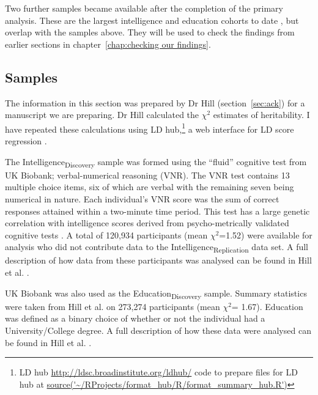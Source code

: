 Two further samples became available after the completion of the primary analysis. These are the largest intelligence and education cohorts to date \cite{savage2018genome}, \cite{lee2018gene} but overlap with the samples above. They will be used to check the findings from earlier sections in chapter~\ref{chap:checking our findings}.

\subsection{Samples}

\label{sec:samples from paper section}
The information in this section was prepared by Dr Hill (section~\ref{sec:ack}) for a manuscript we are preparing. Dr Hill calculated the $\chi^2$ estimates of heritability. I have repeated these calculations using LD hub,\footnote{LD hub \url{http://ldsc.broadinstitute.org/ldhub/} code to prepare files for LD hub at \url{source('~/RProjects/format_hub/R/format_summary_hub.R')}} a web interface for LD score regression \cite{zheng2017ld}.

 The Intelligence\textsubscript{Discovery} sample was formed using the ``fluid'' cognitive test from UK Biobank;  verbal-numerical reasoning (VNR). The VNR test contains 13 multiple choice items, six of which are verbal with the remaining seven being numerical in nature. Each individual’s VNR score was the sum of correct responses attained within a two-minute time period. This test has a large genetic correlation with intelligence scores derived from psycho-metrically validated cognitive tests \cite{hill2019combined}. A total of 120,934 participants (mean $\chi^2$=1.52) were available for analysis who did not contribute data to the Intelligence\textsubscript{Replication}\cite{sniekers2017genome} data set. A full description of how data from these participants was analysed can be found in Hill et al. \cite{hill2019combined}. 
 
UK Biobank was also used as the Education\textsubscript{Discovery} sample. Summary statistics were taken from Hill et al. on 273,274 participants (mean $\chi^2$= 1.67)\cite{hill2019combined}.  Education was defined as a binary choice of whether or not the individual had a University/College degree. A full description of how these data were analysed can be found in Hill et al. \cite{hill2019combined}.

